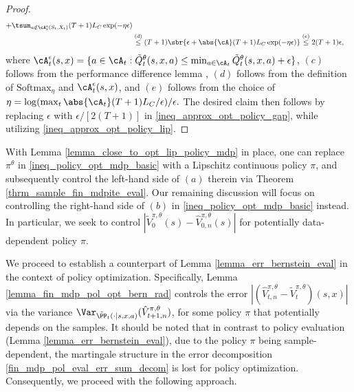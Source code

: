 \documentclass[9pt]{article}
\numberwithin{equation}{section}
\begin{document}
\begin{proof}
\begin{align}
{{        + \tsum_{a \notin \cA_t^\epsilon(S_t, X_t) }  (T+1) L_C \exp(-\eta \epsilon)
        }
    } 
    \nonumber \\
    & \overset{(d)}{\leq}   (T+1) \sbr{ \epsilon 
    + \abs{\cA} (T+1) L_C \exp(-\eta \epsilon) }
    \overset{(e)}{\leq} 2 (T+1) \epsilon,
    \label{ineq_approx_opt_policy_gap}
\end{align}
where 
$\cA_t^\epsilon (s,x)= \{a \in \cA_t: 
\tilde{Q}^\theta_t(s,x,a) \leq 
\min_{a \in \cA_t} \tilde{Q}^\theta_t(s,x,a) + \epsilon 
\}$, 
 $(c)$ follows from the performance difference lemma \cite{kakade2002approximately},
 $(d)$ follows from the definition of $\mathrm{Softmax}_\eta$ and $\cA_t^\epsilon(s,x)$, 
 and $(e)$ follows from the choice of 
$
\eta =  \log( \max_t \abs{\cA_t} (T+1) L_C /\epsilon ) / \epsilon .
$
The desired claim then follows by replacing $\epsilon$
with $\epsilon / [2(T+1)]$ in \eqref{ineq_approx_opt_policy_gap},
while utilizing \eqref{ineq_approx_opt_policy_lip}.
\end{proof}


With Lemma \ref{lemma_close_to_opt_lip_policy_mdp} in place, one can replace $\pi^\theta$ in \eqref{ineq_policy_opt_mdp_basic} with a Lipschitz continuous policy $\pi$, and subsequently control the left-hand side of $(a)$ therein via Theorem \ref{thrm_sample_fin_mdpite_eval}.
Our remaining discussion will focus on controlling the right-hand side of $(b)$ in \eqref{ineq_policy_opt_mdp_basic} instead. 
In particular, we seek to control $|   \tilde{V}^{\pi, \theta}_0(s) - \hat{V}^{\pi, \theta}_{0,n}(s) |$ for potentially data-dependent policy $\pi$. 



We proceed to establish a counterpart of Lemma \ref{lemma_err_bernstein_eval} in the context of  policy optimization. 
Specifically, Lemma \ref{lemma_fin_mdp_pol_opt_bern_rad} controls the error $ |{ (\hat{V}_{t,n}^{\pi, \theta} - \tilde{V}_t^{\pi, \theta})(s,x)} |$ via the  variance
$\Var_{\tilde{\PP}_t(\cdot|s,x,a)} (\hat{V}_{t+1,n}^{\pi, \theta})$, for some policy $\pi$ that potentially depends on the samples.
It should be noted that in contrast to policy evaluation (Lemma \ref{lemma_err_bernstein_eval}),  due to the policy $\pi$ being sample-dependent, the martingale structure in the error decomposition \eqref{fin_mdp_pol_eval_err_sum_decom} is lost for policy optimization. 
Consequently, we proceed with the following approach. 
\end{document}
